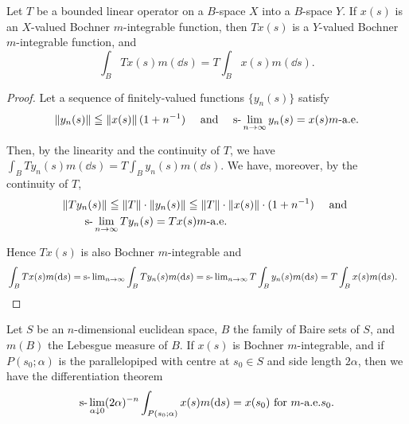 \begin{corollary}\label{cor:V.5.Corollary.2} Let $T$ be a bounded linear operator on a $B$-space $X$ into a $B$-space $Y$. If $x(s)$ is an $X$-valued Bochner $m$-integrable function, then $Tx(s)$ is a $Y$-valued Bochner $m$-integrable function, and 
\[
\int_{B} T x (s) m (\dd s) = T \int_{B} x (s) m (\dd s).
\]
\end{corollary}

\begin{proof}
 Let a sequence of finitely-valued functions $\{y_n(s)\}$ satisfy 
\[
\left\| y _{n} (s) \right\| \leqq \left\| x (s) \right\| (1 + n ^{-1}) \quad \text{ and } \quad \text{s-}\lim _{n \rightarrow \infty} y _{n} (s) = x (s) m\text{-a.e.} \]

Then, by the linearity and the continuity of $T$, we have $\int_{B} T y_n(s) m(\dd s) = T \int_{B} y_n(s) m(\dd s)$. We have, moreover, by the continuity of $T$, 
\[
\begin{aligned}&{\left\| T y _{n} (s) \right\| \leqq \left\| T \right\| \cdot \left\| y _{n} (s) \right\| \leqq \left\| T \right\| \cdot \left\| x (s) \right\| \cdot (1 + n ^{-1}) \quad \text{ and }}\\&{\qquad \text{s-}\lim _{n \rightarrow \infty} T y _{n} (s) = T x (s) m\text{-a.e.}}\end{aligned}
\]

Hence $Tx(s)$ is also Bochner $m$-integrable and 
\[
\begin{aligned}
&\int_{B} T x (s) m (\mathop{}\!\mathrm{d} s)  = \text{s-}\lim\nolimits_{n \to \infty} \int_{B} T y _{n} (s) m (\mathop{}\!\mathrm{d} s) = \text{s-}\lim\nolimits_{n \to \infty} T \int_{B} y _{n} (s) m (\mathop{}\!\mathrm{d} s) = T \int_{B} x (s) m (\mathop{}\!\mathrm{d} s).
\end{aligned}
\]
\end{proof}

\begin{theorem}\label{thm:V.5.Theorem.2} Let $S$ be an $n$-dimensional euclidean space, $B$ the family of Baire sets of $S$, and $m(B)$ the Lebesgue measure of $B$. If $x(s)$ is Bochner $m$-integrable, and if $P(s_{0};\alpha)$ is the parallelopiped with centre at $s_{0}\in S$ and side length $2\alpha$, then we have the differentiation theorem 
\[
\text{s-}\lim _{\alpha \downarrow 0} (2 \alpha) ^{-n} \int_ {P (s _{0}; \alpha)} x (s) m (\mathop{}\!\mathrm{d} s) = x (s _{0}) \text{ for } m\text{-a.e.} s _{0}.
\]
\end{theorem}

